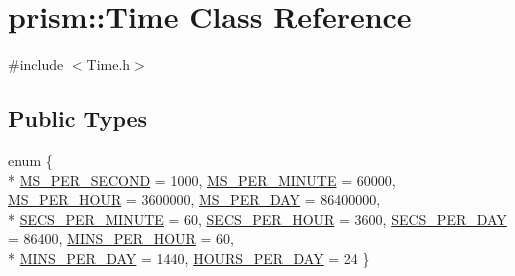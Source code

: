 \hypertarget{classprism_1_1_time}{}\section{prism\+:\+:Time Class Reference}
\label{classprism_1_1_time}


{\ttfamily \#include $<$Time.\+h$>$}

\subsection*{Public Types}
\begin{DoxyCompactItemize}
\item 
enum \{ \\*
\hyperlink{classprism_1_1_time_a4f8bc7cc739ace83cbe9d7aff667d053a936aeb84b0e60cf062adb25a35cf2fda}{M\+S\+\_\+\+P\+E\+R\+\_\+\+S\+E\+C\+O\+ND} = 1000, 
\hyperlink{classprism_1_1_time_a4f8bc7cc739ace83cbe9d7aff667d053a91c834280bbe9c6ce2ea438f0132ca60}{M\+S\+\_\+\+P\+E\+R\+\_\+\+M\+I\+N\+U\+TE} = 60000, 
\hyperlink{classprism_1_1_time_a4f8bc7cc739ace83cbe9d7aff667d053aed67b9c928af60c5cad839b71253ad1c}{M\+S\+\_\+\+P\+E\+R\+\_\+\+H\+O\+UR} = 3600000, 
\hyperlink{classprism_1_1_time_a4f8bc7cc739ace83cbe9d7aff667d053aab960bfe4c84e6bd79bd4fd5b038bffd}{M\+S\+\_\+\+P\+E\+R\+\_\+\+D\+AY} = 86400000, 
\\*
\hyperlink{classprism_1_1_time_a4f8bc7cc739ace83cbe9d7aff667d053a0e58469de7dd0d126a53b68db3e35ee0}{S\+E\+C\+S\+\_\+\+P\+E\+R\+\_\+\+M\+I\+N\+U\+TE} = 60, 
\hyperlink{classprism_1_1_time_a4f8bc7cc739ace83cbe9d7aff667d053a43bac766fad2dce180ae4fff8a66441f}{S\+E\+C\+S\+\_\+\+P\+E\+R\+\_\+\+H\+O\+UR} = 3600, 
\hyperlink{classprism_1_1_time_a4f8bc7cc739ace83cbe9d7aff667d053a73e1d097f17207730eb6935270e05c05}{S\+E\+C\+S\+\_\+\+P\+E\+R\+\_\+\+D\+AY} = 86400, 
\hyperlink{classprism_1_1_time_a4f8bc7cc739ace83cbe9d7aff667d053a3f4160b1bb1b56fbd23f53e614bd0bad}{M\+I\+N\+S\+\_\+\+P\+E\+R\+\_\+\+H\+O\+UR} = 60, 
\\*
\hyperlink{classprism_1_1_time_a4f8bc7cc739ace83cbe9d7aff667d053a890a5f1d86e152fc8c5d3ca4b6673207}{M\+I\+N\+S\+\_\+\+P\+E\+R\+\_\+\+D\+AY} = 1440, 
\hyperlink{classprism_1_1_time_a4f8bc7cc739ace83cbe9d7aff667d053a2321329da5265ab087381f8c0483403e}{H\+O\+U\+R\+S\+\_\+\+P\+E\+R\+\_\+\+D\+AY} = 24
 \}
\end{DoxyCompactItemize}
